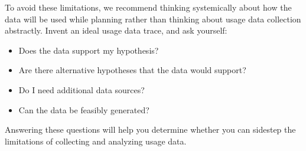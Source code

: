 To avoid these limitations, we recommend thinking systemically about how the data will be used while planning rather than thinking about usage data collection abstractly.
Invent an ideal usage data trace, and ask yourself:

\begin{itemize}[noitemsep]
  \item Does the data support my hypothesis?
  \item Are there alternative hypotheses that the data would support?
  \item Do I need additional data sources?
  \item Can the data be feasibly generated?
\end{itemize}

\noindent
Answering these questions will help you determine whether you can sidestep
the limitations of collecting and analyzing usage data.

%
%
%

